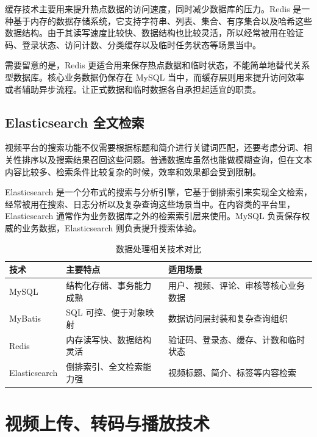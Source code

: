 缓存技术主要用来提升热点数据的访问速度，同时减少数据库的压力。Redis 是一种基于内存的数据存储系统，它支持字符串、列表、集合、有序集合以及哈希这些数据结构\cite{redisdocs}。由于其读写速度比较快、数据结构也比较灵活，所以经常被用在验证码、登录状态、访问计数、分类缓存以及临时任务状态等场景当中。

需要留意的是，Redis 更适合用来保存热点数据和临时状态，不能简单地替代关系型数据库。核心业务数据仍保存在 MySQL 当中，而缓存层则用来提升访问效率或者辅助异步流程。让正式数据和临时数据各自承担起适宜的职责。

\subsection{Elasticsearch 全文检索}
\label{subsec:elasticsearch-search}

视频平台的搜索功能不仅需要根据标题和简介进行关键词匹配，还要考虑分词、相关性排序以及搜索结果召回这些问题。普通数据库虽然也能做模糊查询，但在文本内容比较多、检索条件比较复杂的时候，效率和效果都会受到限制。

Elasticsearch 是一个分布式的搜索与分析引擎，它基于倒排索引来实现全文检索，经常被用在搜索、日志分析以及复杂查询这些场景当中\cite{elasticsearchdocs}。在内容类的平台里，Elasticsearch 通常作为业务数据库之外的检索索引层来使用。MySQL 负责保存权威的业务数据，Elasticsearch 则负责提升搜索体验。

\begin{table}[htbp]
  \centering
  \caption{数据处理相关技术对比}
  \label{tab:data-tech-summary}
  \begin{tabular}{p{}p{}p{}}
    \hline
    \textbf{技术} & \textbf{主要特点} & \textbf{适用场景} \\
    \hline
    MySQL & 结构化存储、事务能力成熟 & 用户、视频、评论、审核等核心业务数据 \\
    MyBatis & SQL 可控、便于对象映射 & 数据访问层封装和复杂查询组织 \\
    Redis & 内存读写快、数据结构灵活 & 验证码、登录态、缓存、计数和临时状态 \\
    Elasticsearch & 倒排索引、全文检索能力强 & 视频标题、简介、标签等内容检索 \\
    \hline
  \end{tabular}
\end{table}

\section{视频上传、转码与播放技术}
\label{sec:video-upload-transcode-play}

